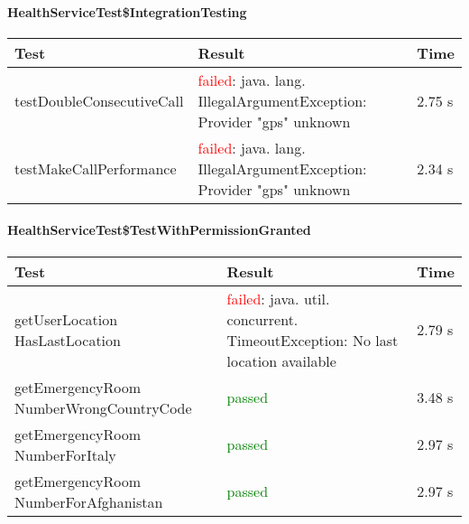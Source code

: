     
\paragraph{HealthServiceTest\$IntegrationTesting}

  \begin{adjustwidth}{1cm}{}
        \begin{longtable}{|p{}|p{}|p{}|}
            \hline
            \textbf{Test} & \textbf{Result} & \textbf{Time} \\
            \hline
            testDoubleConsecutiveCall & \textcolor{red}{failed}: java. lang. IllegalArgumentException: Provider "gps" unknown   & 2.75 s \\
            \hline
            testMakeCallPerformance & \textcolor{red}{failed}: java. lang. IllegalArgumentException: Provider "gps" unknown  & 2.34 s \\
            \hline
        
        \end{longtable}
    \end{adjustwidth}
    
    
\paragraph{HealthServiceTest\$TestWithPermissionGranted}

  \begin{adjustwidth}{1cm}{}
        \begin{longtable}{|p{}|p{}|p{}|}
            \hline
            \textbf{Test} & \textbf{Result} & \textbf{Time} \\
            \hline
            getUserLocation HasLastLocation & \textcolor{red}{failed}: java. util. concurrent. TimeoutException: No last location available     & 2.79 s \\
            \hline
            getEmergencyRoom NumberWrongCountryCode & \textcolor{green}{passed} & 3.48 s \\
            \hline
            getEmergencyRoom NumberForItaly & \textcolor{green}{passed}  & 2.97 s \\
            \hline
            getEmergencyRoom NumberForAfghanistan & \textcolor{green}{passed}  & 2.97 s \\
            \hline
        
        \end{longtable}
    \end{adjustwidth}
    
